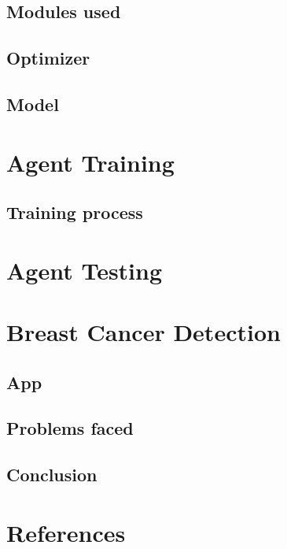 \documentclass[11pt]{article}
\begin{document}
\subsection{Modules used}

\subsection{Optimizer}

\subsection{Model}


\section{Agent Training}
\subsection{Training process}

\newpage
\section{Agent Testing}


\section{Breast Cancer Detection}
\subsection{App}

\subsection{Problems faced}

\subsection{Conclusion}


\section{References}

\newpage
\printbibliography
\end{document}
